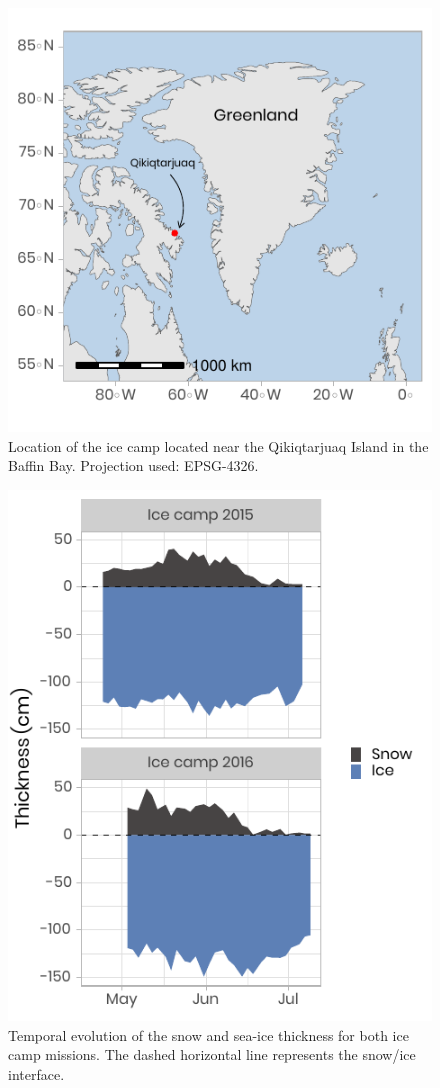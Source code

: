 \documentclass[essd, manuscript]{copernicus}
\begin{document}
\begin{figure}[H]
	\centering
	\includegraphics[scale = 1]{../../../../graphs/fig01.pdf}
	\caption{Location of the ice camp located near the Qikiqtarjuaq Island in the Baffin Bay. Projection used: EPSG-4326.}
\end{figure}

\begin{figure}[H]
	\centering
	\includegraphics[scale = 1]{../../../../graphs/fig02.pdf}
	\caption{Temporal evolution of the snow and sea-ice thickness for both ice camp missions. The dashed horizontal line represents the snow/ice interface.}
\end{figure}
\end{document}
